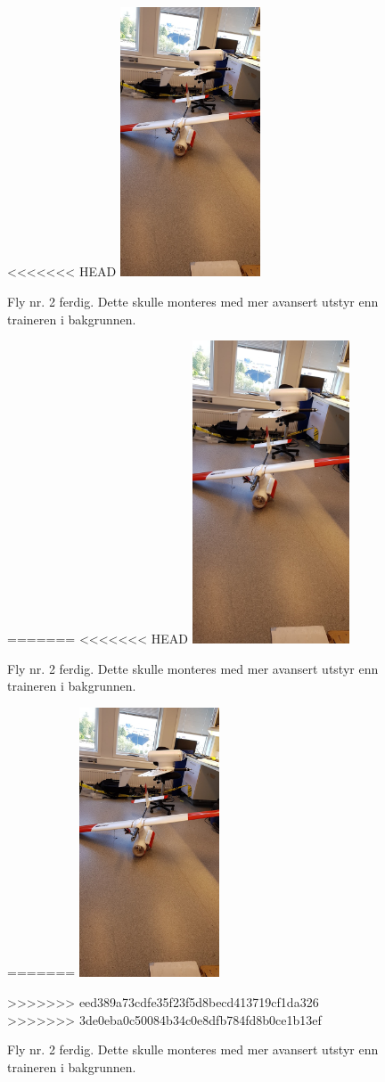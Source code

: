 \documentclass[12pt, a4paper]{article}
\begin{document}
\begin{figure}[h]
	\centering
<<<<<<< HEAD
	\includegraphics[width = .6\textwidth, height = 8cm]{bilder/andre_fly_ferdigstilt.jpg}
	\caption[Fly nummer to ferdig]{Fly nr. 2 ferdig. Dette skulle monteres med mer avansert utstyr enn traineren i bakgrunnen.}
=======
<<<<<<< HEAD
	\includegraphics[width = .45\textwidth, height = 9cm]{bilder/andre_fly_ferdigstilt.jpg}
	\caption{Fly nr. 2 ferdig. Dette skulle monteres med mer avansert utstyr enn traineren i bakgrunnen.}
=======
	\includegraphics[width = .6\textwidth, height = 8cm]{bilder/andre_fly_ferdigstilt.jpg}
	\caption[Fly nummer to ferdig]{Fly nr. 2 ferdig. Dette skulle monteres med mer avansert utstyr enn traineren i bakgrunnen.}
>>>>>>> eed389a73cdfe35f23f5d8becd413719cf1da326
>>>>>>> 3de0eba0c50084b34c0e8dfb784fd8b0ce1b13ef
\end{figure}
\end{document}
